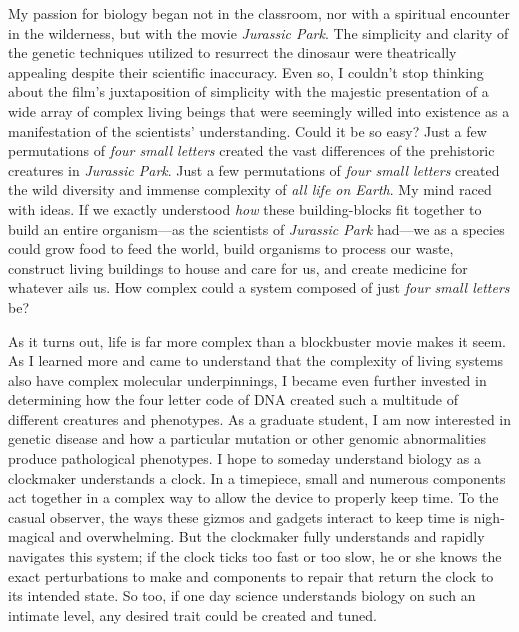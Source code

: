 \documentclass[12pt]{article}
\begin{document}

My passion for biology began not in the classroom, nor with a spiritual encounter in the wilderness, but with the movie \textit{Jurassic Park}. The simplicity and clarity of the genetic techniques utilized to resurrect the dinosaur were theatrically appealing despite their scientific inaccuracy. Even so, I couldn't stop thinking about the film's juxtaposition of simplicity with the majestic presentation of a wide array of complex living beings that were seemingly willed into existence as a manifestation of the scientists' understanding. Could it be so easy? Just a few permutations of \textit{four small letters} created the vast differences of the prehistoric creatures in \textit{Jurassic Park}. Just a few permutations of \textit{four small letters} created the wild diversity and immense complexity of \textit{all life on Earth}. My mind raced with ideas. If we exactly understood \textit{how} these building-blocks fit together to build an entire organism---as the scientists of \textit{Jurassic Park} had---we as a species could grow food to feed the world, build organisms to process our waste, construct living buildings to house and care for us, and create medicine for whatever ails us. How complex could a system composed of just \textit{four small letters} be?

As it turns out, life is far more complex than a blockbuster movie makes it seem. As I learned more and came to understand that the complexity of living systems also have complex molecular underpinnings, I became even further invested in determining how the four letter code of DNA created such a multitude of different creatures and phenotypes. As a graduate student, I am now interested in genetic disease and how a particular mutation or other genomic abnormalities produce pathological phenotypes. I hope to someday understand biology as a clockmaker understands a clock. In a timepiece, small and numerous components act together in a complex way to allow the device to properly keep time. To the casual observer, the ways these gizmos and gadgets interact to keep time is nigh-magical and overwhelming. But the clockmaker fully understands and rapidly navigates this system; if the clock ticks too fast or too slow, he or she knows the exact perturbations to make and components to repair that return the clock to its intended state. So too, if one day science understands biology on such an intimate level, any desired trait could be created and tuned.
\end{document}
